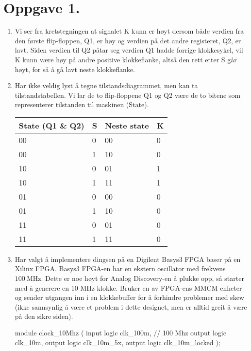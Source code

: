 \documentclass[a4paper,11pt,norsk]{article}
\begin{document}


\section*{Oppgave 1.}
\begin{enumerate}
    \item Vi ser fra kretstegningen at signalet K kunn er høyt dersom både verdien fra den første flip-floppen, Q1, er høy og verdien på det andre 
        registeret, Q2, er lavt. Siden verdien til Q2 påtar seg verdien Q1 hadde forrige klokkesykel, vil K kunn være høy på andre positive klokkeflanke,
        altså den rett etter S går høyt, for så å gå lavt neste klokkeflanke.
    \item Har ikke veldig lyst å tegne tilstandsdiagrammet, men kan ta tilstandstabellen. Vi lar de to flip-floppene Q1 og Q2 være de to bitene 
        som representerer tilstanden til maskinen (State).
        \begin{table}[H]
            \centering
            \begin{tabular}{|l|l|l|l|}
                \hline
                \textbf{State (Q1 \& Q2)} & \textbf{S} & \textbf{Neste state} & \textbf{K} \\
                \hline
                00 & 0 & 00 & 0 \\
                00 & 1 & 10 & 0 \\
                10 & 0 & 01 & 1 \\
                10 & 1 & 11 & 1 \\
                01 & 0 & 00 & 0 \\
                01 & 1 & 10 & 0 \\
                11 & 0 & 01 & 0 \\
                11 & 1 & 11 & 0 \\
                \hline
            \end{tabular}
        \end{table}

    \item Har valgt å implementere dingsen på en Digilent Basys3 FPGA baser på en Xilinx FPGA. Basys3 FPGA-en har en ekstern oscillator med frekvens
        $\SI{100}{\mega\hertz}$. Dette er noe høyt for Analog Discovery-en å plukke opp, så starter med å generere en 10 MHz klokke.
        Bruker en av FPGA-ens MMCM enheter og sender utgangen inn i en klokkebuffer for å forhindre problemer med skew (ikke sannsynlig å være et problem 
        i dette designet, men er alltid greit å være på den sikre siden).
\begin{codebox}[verilog]
module clock_10Mhz (
    input logic clk_100m,    // 100 Mhz
    output logic clk_10m,
    output logic clk_10m_5x,
    output logic clk_10m_locked
    );


\end{codebox}
\end{enumerate}
\end{document}
